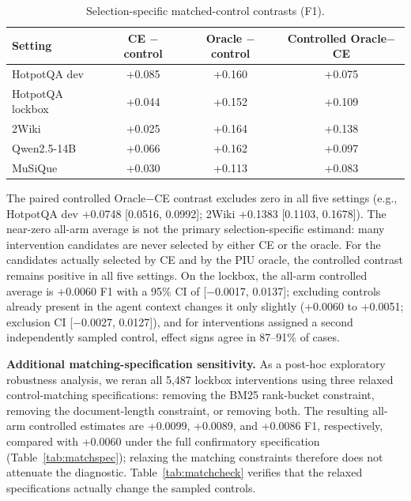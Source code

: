 \documentclass[10pt]{article}
\newcommand{\stitle}[1]{\vspace{0.4em}\noindent\textbf{#1}\hspace{0.6em}}
\begin{document}
\begin{table}[h]
\centering
\small
\caption{Selection-specific matched-control contrasts (F1).}
\label{tab:matchedcontrol}
\begin{tabular}{lccc}
\toprule
\textbf{Setting} & \textbf{CE $-$ control} & \textbf{Oracle $-$ control} &
\textbf{Controlled Oracle$-$CE} \\
\midrule
HotpotQA dev     & +0.085 & +0.160 & +0.075 \\
HotpotQA lockbox & +0.044 & +0.152 & +0.109 \\
2Wiki            & +0.025 & +0.164 & +0.138 \\
Qwen2.5-14B      & +0.066 & +0.162 & +0.097 \\
MuSiQue          & +0.030 & +0.113 & +0.083 \\
\bottomrule
\end{tabular}
\end{table}

\noindent
The paired controlled Oracle$-$CE contrast excludes zero in all five
settings (e.g., HotpotQA dev +0.0748 [0.0516, 0.0992]; 2Wiki +0.1383
[0.1103, 0.1678]). The near-zero all-arm average is not the primary
selection-specific estimand: many intervention candidates are never
selected by either CE or the oracle. For the candidates actually selected by
CE and by the PIU oracle, the controlled contrast remains positive in all
five settings. On the lockbox, the all-arm controlled average is +0.0060 F1
with a 95\% CI of [$-$0.0017, 0.0137]; excluding controls already present in
the agent context changes it only slightly (+0.0060 to +0.0051; exclusion CI
[$-$0.0027, 0.0127]), and for interventions assigned a second independently
sampled control, effect signs agree in 87--91\% of cases.

\stitle{Additional matching-specification sensitivity.}
As a post-hoc exploratory robustness analysis, we reran all 5{,}487 lockbox
interventions using three relaxed control-matching specifications: removing
the BM25 rank-bucket constraint, removing the document-length constraint, or
removing both. The resulting all-arm controlled estimates are +0.0099,
+0.0089, and +0.0086 F1, respectively, compared with +0.0060 under the full
confirmatory specification (Table~\ref{tab:matchspec}); relaxing the
matching constraints therefore does not attenuate the diagnostic.
Table~\ref{tab:matchcheck} verifies that the relaxed specifications actually
change the sampled controls.
\end{document}
